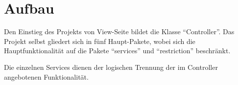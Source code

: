 \section{Aufbau}\label{sec:aufbau}
    \begin{center}
    \end{center}

\clearpage
Den Einstieg des Projekts von View-Seite bildet die Klasse \enquote{Controller}.
Das Projekt selbst gliedert sich in fünf Haupt-Pakete, wobei sich die Hauptfunktionalität
auf die Pakete \enquote{services} und \enquote{restriction} beschränkt.

Die einzelnen Services dienen der logischen Trennung der im Controller angebotenen Funktionalität.


